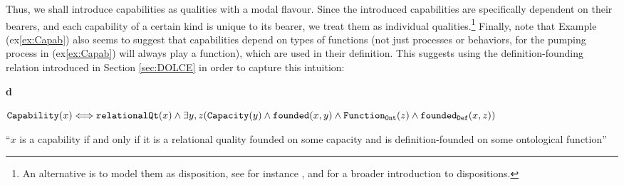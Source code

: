 \documentclass[sw]{iosart2x}
\newcommand{\bflist}{\begin{list}{}{\setlength{\topsep}{2mm}\setlength{\partopsep}{0mm}\setlength{\parsep}{0mm}\setlength{\leftmargin}{9mm}\setlength{\labelwidth}{8mm}}}
\newcommand{\eflist}{\end{list}}
\newcommand{\DefLabel}{\textrm{d}}
\newcommand{\ExLabel}{\textrm{ex}}
\newcounter{cntdef}
\newcommand{\mydf}[1]{\refstepcounter{cntdef}\begin{small}{\bf \DefLabel\thecntdef\label{def:#1}}\end{small}}
\newcommand{\mytext}[1]{``#1''}
\newcommand{\refdf}[1]{({\DefLabel}\ref{#1})}
\newcommand{\refex}[1]{({\ExLabel}\ref{#1})}
\newcommand{\generalStyle}[1]{\texttt{#1}}
\newcommand{\biRel}[3]{\generalStyle{#1}(#2,#3)}
\newcommand{\uniRel}[2]{\generalStyle{#1}(#2)}
\newcommand{\uniRelPar}[3]{\generalStyle{#1}_{\generalStyle{#3}}(#2)}
\newcommand{\biRelPar}[4]{\generalStyle{#1}_{\generalStyle{#4}}(#2,#3)}
\newcommand{\myiff}{\Longleftrightarrow}
\newcommand{\Capability}[1]{\uniRel{Capability}{#1}}
\newcommand{\Capacity}[1]{\uniRel{Capacity}{#1}}
\newcommand{\RelationalQuality}[1]{\uniRel{relationalQt}{#1}}
\newcommand{\FunctionAbs}[1]{\uniRelPar{Function}{#1}{Ont}}
\newcommand{\founded}[2]{\biRel{\foundedTerm{passive}}{#1}{#2}}
\newcommand{\foundedDef}[2]{\biRelPar{\foundedTerm{passive}}{#1}{#2}{Def}}
\newcommand{\foundedTerm}[1]{%
  \ifthenelse{\equal{#1}{passive}}{founded}{%
    \ifthenelse{\equal{#1}{verb}}{found}{%
      \ifthenelse{\equal{#1}{gerund}}{founding}{%
        ERROR!%
      }%
    }%
  }%
}
\newcommand{\myComment}[1]{{\unskip \ignorespaces}}
\begin{document}
Thus, we shall introduce capabilities as qualities with a modal flavour. Since the introduced capabilities are specifically dependent on their bearers, and each capability of a certain kind is unique to its bearer, we treat them as individual qualities.\footnote{An alternative is to model them as disposition, see for instance \cite{sarkarOntologyModelProcess2019}, and \cite{MALZKORN2001335} for a broader introduction to dispositions.} 
Finally, note that Example \refex{ex:Capab} also seems to suggest that capabilities depend on types of functions (not just processes or behaviors, for the pumping process in \refex{ex:Capab} will always play a function), which are used in their definition. This suggests using the definition-founding  \myComment{\refdf{def:foundingDefinitionally}} relation introduced in Section \ref{sec:DOLCE} in order to capture this intuition:
\bflist
\item[\mydf{capability}] $ \Capability{x} \myiff  \RelationalQuality{x} \land \exists y,z(\Capacity{y} \land \founded{x}{y} \land \FunctionAbs{z} \land \foundedDef{x}{z}) $  
\item[] \mytext{$x$ is a capability if and only if it is a relational quality founded on some capacity and is definition-founded on some ontological function}
\eflist
\end{document}

